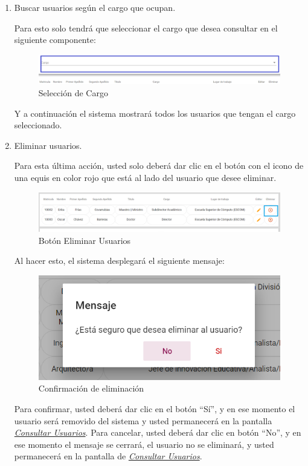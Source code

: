   \begin{enumerate}

  	\item   Buscar usuarios según el cargo que ocupan.

  	Para esto solo tendrá que seleccionar el cargo que desea consultar en el siguiente componente:

  	\begin{figure}[H]
  		\centering
  		\hypertarget{cargo1}{\includegraphics[width=0.7\linewidth]{images/SP5/BtnCargo1}}
  		\caption{Selección de Cargo}
  		\label{cargo1}
  	\end{figure}

  	Y a continuación el sistema mostrará todos los usuarios que tengan el cargo seleccionado.

  	   \newpage

  	\item Eliminar usuarios.

  	Para esta última acción, usted solo deberá dar clic en el botón con el icono de una equis en color rojo que está al lado del usuario que desee  eliminar.

  	\begin{figure}[H]
  		\centering
  		\hypertarget{eliminar}{\includegraphics[width=0.7\linewidth]{images/SP5/BtnEliminar}}
  		\caption{Botón Eliminar Usuarios}
  		\label{eliminar}
  	\end{figure}

  	Al hacer esto, el sistema desplegará el siguiente mensaje:

  	\begin{figure}[H]
  		\centering
  		\includegraphics[width=0.4\linewidth]{images/SP5/MSG22}
  		\caption{Confirmación de eliminación}
  		\label{confirmarE}

  	\end{figure}

  	Para confirmar, usted deberá dar clic en el botón “Sí”, y en ese momento el usuario será removido del sistema y usted permanecerá en la pantalla \hyperlink{consultarUs}{\textit{Consultar Usuarios}}.
  	Para cancelar, usted deberá dar clic en botón “No”, y en ese momento el mensaje se cerrará, el usuario no se eliminará, y usted permanecerá en la pantalla de \hyperlink{consultarUs}{\textit{Consultar Usuarios}}.

  \end{enumerate}

